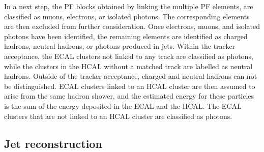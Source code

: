In a next step, the \ac{PF} blocks obtained by linking the multiple \ac{PF} elements, are classified as muons, electrons, or isolated photons. The corresponding elements are then excluded from further consideration. Once electrons, muons, and isolated photons have been identified, the remaining elements are identified as charged hadrons, neutral hadrons, or photons produced in jets. Within the tracker acceptance, the \ac{ECAL} clusters not linked to any track are classified as photons, while the clusters in the \ac{HCAL} without a matched track are labelled as neutral hadrons. Outside of the tracker acceptance, charged and neutral hadrons can not be distinguished. \ac{ECAL} clusters linked to an \ac{HCAL} cluster are then assumed to arise from the same hadron shower, and the estimated energy for these particles is the sum of the energy deposited in the \ac{ECAL} and the \ac{HCAL}. The \ac{ECAL} clusters that are not linked to an \ac{HCAL} cluster are classified as photons.

% 
% 
\subsection{Jet reconstruction}
\label{sec:jet_reconstruction}

% 

